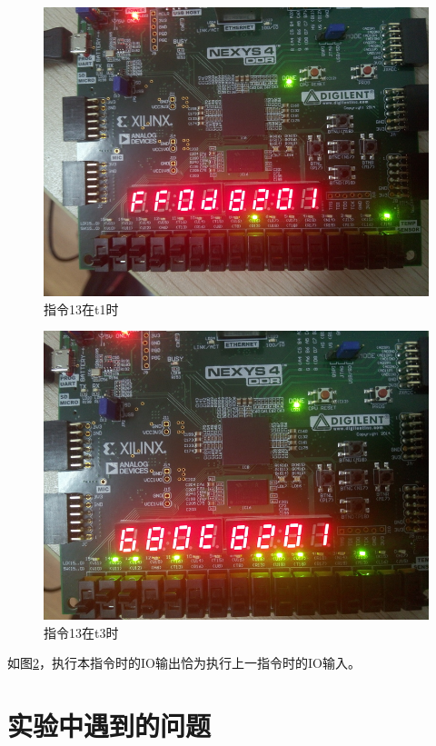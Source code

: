 \documentclass[forprint]{WHUBachelor}
\begin{document}
\begin{figure}[H]
  \centering
  \includegraphics[width=5in]{figures/download/c0.jpg}
  \caption{指令13在t1时}
  \label{fig:down:c0}
\end{figure}

\begin{figure}[H]
  \centering
  \includegraphics[width=5in]{figures/download/c2.jpg}
  \caption{指令13在t3时}
  \label{fig:down:c2}
\end{figure}

如图\ref{fig:down:c2}，执行本指令时的IO输出恰为执行上一指令时的IO输入。

\chapter{实验中遇到的问题}
\end{document}
